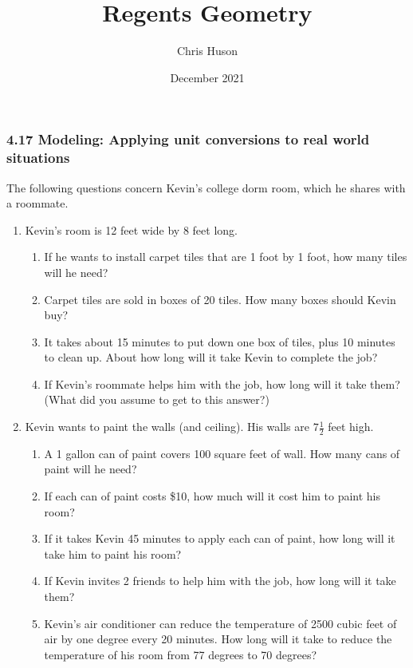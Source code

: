 \documentclass[12pt, twoside]{article}
\title{Regents Geometry}
\author{Chris Huson}
\date{December 2021}
\begin{document}
\subsubsection*{4.17 Modeling: Applying unit conversions to real world situations}

The following questions concern Kevin’s college dorm room, which he shares with a roommate.

\begin{enumerate}


\item Kevin’s room is 12 feet wide by 8 feet long.
\begin{enumerate}
  \item If he wants to install carpet tiles that are 1 foot by 1 foot, how many tiles will he need? \vspace{3cm}
  \item Carpet tiles are sold in boxes of 20 tiles. How many boxes should Kevin buy? \vspace{4cm}
  \item It takes about 15 minutes to put down one box of tiles, plus 10 minutes to clean up. About how long will it take Kevin to complete the job?  \vspace{5cm}
  \item If Kevin's roommate helps him with the job, how long will it take them? \\ 
  (What did you assume to get to this answer?) \vspace{3cm}
\end{enumerate}

\newpage
\item Kevin wants to paint the walls (and ceiling). His walls are $7 \frac{1}{2}$ feet high.
\begin{enumerate}
  \item A 1 gallon can of paint covers 100 square feet of wall. How many cans of paint will he need?  \vspace{5cm}
  \item If each can of paint costs \$10, how much will it cost him to paint his room? \vspace{2cm}
  \item If it takes Kevin 45 minutes to apply each can of paint, how long will it take him to paint his room? \vspace{2cm}
  \item If Kevin invites 2 friends to help him with the job, how long will it take them?  \vspace{2cm}
  \item Kevin’s air conditioner can reduce the temperature of 2500 cubic feet of air by one degree every 20 minutes. How long will it take to reduce the temperature of his room from 77 degrees to 70 degrees?
\end{enumerate}


\end{enumerate}
\end{document}
